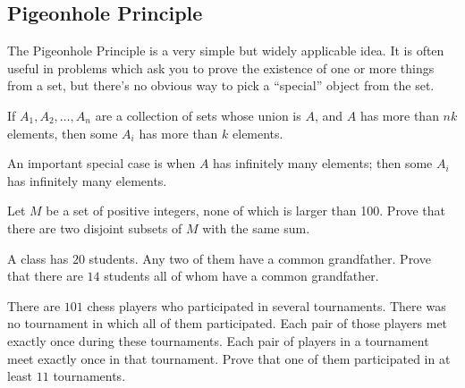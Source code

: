 \subsection{Pigeonhole Principle}
The Pigeonhole Principle is a very simple but widely applicable idea. It is
often useful in problems which ask you to prove the existence of one or more
things from a set, but there's no obvious way to pick a ``special'' object from
the set.
\begin{result}{\label{r:b:c:p:1}}
  If $A_1,A_2,\ldots,A_n$ are a collection of sets whose union is $A$, and $A$
  has more than $nk$ elements, then some $A_i$ has more than $k$ elements.
\end{result}
An important special case is when $A$ has infinitely many elements; then some
$A_i$ has infinitely many elements.
\begin{problem}{\label{p:b:c:p:1}}
  Let $M$ be a set of positive integers, none of which is larger than 100. Prove
  that there are two disjoint subsets of $M$ with the same sum.
\end{problem}
\begin{problem}{\label{p:b:c:p:2}}
  A class has $20$ students. Any two of them have a common grandfather. Prove
  that there are $14$ students all of whom have a common grandfather.
\end{problem}
\begin{problem}{\label{p:b:c:p:3}}
  There are $101$ chess players who participated in several tournaments. There
  was no tournament in which all of them participated. Each pair of those
  players met exactly once during these tournaments. Each pair of players in a
  tournament meet exactly once in that tournament. Prove that one of them
  participated in at least $11$ tournaments.
\end{problem}
